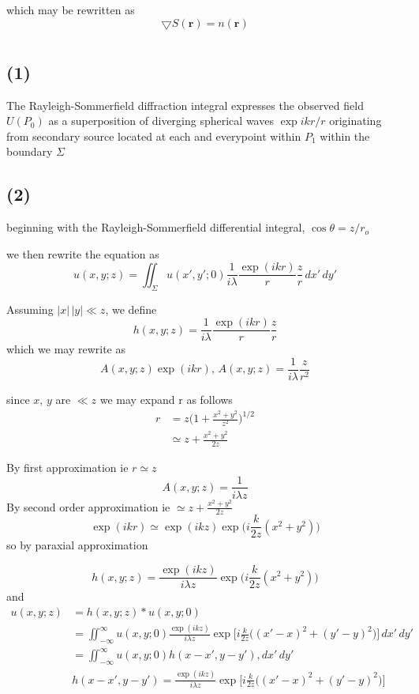 \documentclass[24 pts]{article}
\begin{document}
which may be rewritten as 
\begin{equation}
\bigtriangledown S(\mathbf{r})=n(\mathbf{r})
\end{equation}

\section{}
\subsection{(1)}
The Rayleigh-Sommerfield diffraction integral expresses the observed field $U(P_0)$ as a superposition of diverging spherical waves $\exp{ikr}/r$ originating from secondary source located at each and everypoint within $P_1$ within the boundary $\Sigma$

\subsection{(2)}
beginning with the Rayleigh-Sommerfield differential integral, $\cos{\theta}=z/r_o$

we then rewrite the equation as
\begin{equation}
u(x,y;z)=\iint_{\Sigma}^{}u(x',y';0)\frac{1}{i\lambda} \frac{\exp(ikr)}{r}\frac{z}{r}\,dx'\,dy'
\end{equation}

Assuming $|x|\, |y|\ll z$, we define $$h(x,y;z)=\frac{1}{i\lambda} \frac{\exp(ikr)}{r}\frac{z}{r}$$
which we may rewrite as $$A(x,y;z)\exp(ikr),\, A(x,y;z)= \frac{1}{i\lambda}\frac{z}{r^2}$$

since $x, \, y$ are $\ll z$ we may expand r as follows
\begin{equation}
\begin{split}
r&=z\Big(1+\frac{x^2+y^2}{z^2}\Big)^{1/2}\\
&\simeq z+\frac{x^2+y^2}{2z}
\end{split}
\end{equation}

By first approximation ie $r\simeq z$
$$A(x,y;z)= \frac{1}{i\lambda z}$$
By second order approximation ie $\simeq z+\frac{x^2+y^2}{2z}$
$$ \exp(ikr)\simeq \exp(ikz)\exp\big(i\frac{k}{2z}(x^2+y^2)\big)$$
so by paraxial approximation

\begin{equation}
h(x,y;z)=\frac{ \exp(ikz)}{i\lambda z}\exp\Big(i\frac{k}{2z}(x^2+y^2)\big)
\end{equation}
and
\begin{equation}
\begin{split}
 u(x,y;z)&=h(x,y;z)*u(x,y;0)\\
&=\iint_{-\infty}^{\infty}u(x,y;0)\frac{ \exp(ikz)}{i\lambda z}\exp\Big[i\frac{k}{2z}\big({(x'-x)}^2+{(y'-y)}^2\big)\big]\,dx'\, dy'\\
&=\iint_{-\infty}^{\infty}u(x,y;0)h(x-x',y-y'),dx'\, dy'\\
&h(x-x',y-y')=\frac{ \exp(ikz)}{i\lambda z}\exp\Big[i\frac{k}{2z}\big({(x'-x)}^2+{(y'-y)}^2\big)\big]
\end{split}
\end{equation}
\end{document}
